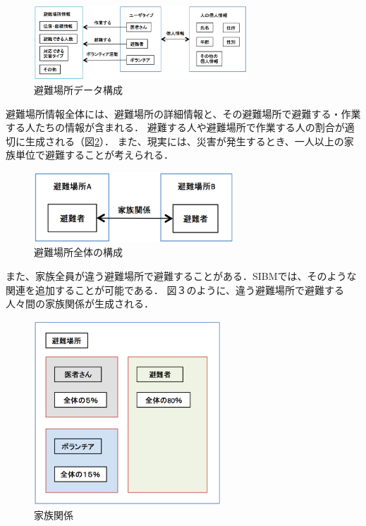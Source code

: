 \begin{figure}[h!]
 	\begin{center}
 		\includegraphics[width=80mm]{./images/fig1.eps}
 		\caption{避難場所データ構成}
 		\label{fig:sibm_structrure}
 	\end{center}
\end{figure}

避難場所情報全体には、避難場所の詳細情報と、その避難場所で避難する・作業する人たちの情報が含まれる．
避難する人や避難場所で作業する人の割合が適切に生成される（図\ref{fig:sibm_shelter}）．
また、現実には、災害が発生するとき、一人以上の家族単位で避難することが考えられる．

\begin{figure}[h!]
 	\begin{center}
 		\includegraphics[width=75mm]{./images/fig2.eps}
 		\caption{避難場所全体の構成}
 		\label{fig:sibm_shelter}
 	\end{center}
\end{figure}

また、家族全員が違う避難場所で避難することがある．SIBMでは、そのような関連を追加することが可能である．
図３のように、違う避難場所で避難する人々間の家族関係が生成される．

\begin{figure}[h!]
 	\begin{center}
 		\includegraphics[width=70mm]{./images/fig4.eps}
 		\caption{家族関係}
 		\label{fig:sibm_relationship}
 	\end{center}
\end{figure}

